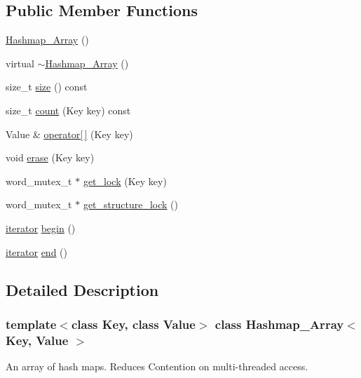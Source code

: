 \subsection*{Public Member Functions}
\begin{DoxyCompactItemize}
\item 
\hyperlink{class_hashmap___array_aa3f0961bafd3303fce6f490a5b2cac63}{Hashmap\_\-Array} ()
\item 
virtual \hyperlink{class_hashmap___array_aec77a7e86dcbe2ace59b2d8949e9e4ab}{$\sim$Hashmap\_\-Array} ()
\item 
size\_\-t \hyperlink{class_hashmap___array_aa42f51c115eda16684ecf8b2fc25e121}{size} () const 
\item 
size\_\-t \hyperlink{class_hashmap___array_a9db5027ea4a86a0e9907f017025b048f}{count} (Key key) const 
\item 
Value \& \hyperlink{class_hashmap___array_a856e61ce8b5a9c3286a2af305df4bfe4}{operator\mbox{[}$\,$\mbox{]}} (Key key)
\item 
void \hyperlink{class_hashmap___array_a0397d0bf1b29c5e71341b4f0c85b5bf1}{erase} (Key key)
\item 
word\_\-mutex\_\-t $\ast$ \hyperlink{class_hashmap___array_a98060703f13d5182cb879a327cc06622}{get\_\-lock} (Key key)
\item 
word\_\-mutex\_\-t $\ast$ \hyperlink{class_hashmap___array_adf8830a2535d8f3dd165ca6032204f51}{get\_\-structure\_\-lock} ()
\item 
\hyperlink{class_hashmap___array_1_1iterator}{iterator} \hyperlink{class_hashmap___array_a35beea246e2f628b6dfc025210ececda}{begin} ()
\item 
\hyperlink{class_hashmap___array_1_1iterator}{iterator} \hyperlink{class_hashmap___array_abd1273f016c450ddf9f400904a28e5ce}{end} ()
\end{DoxyCompactItemize}


\subsection{Detailed Description}
\subsubsection*{template$<$class Key, class Value$>$ class Hashmap\_\-Array$<$ Key, Value $>$}

An array of hash maps. Reduces Contention on multi-\/threaded access. 

